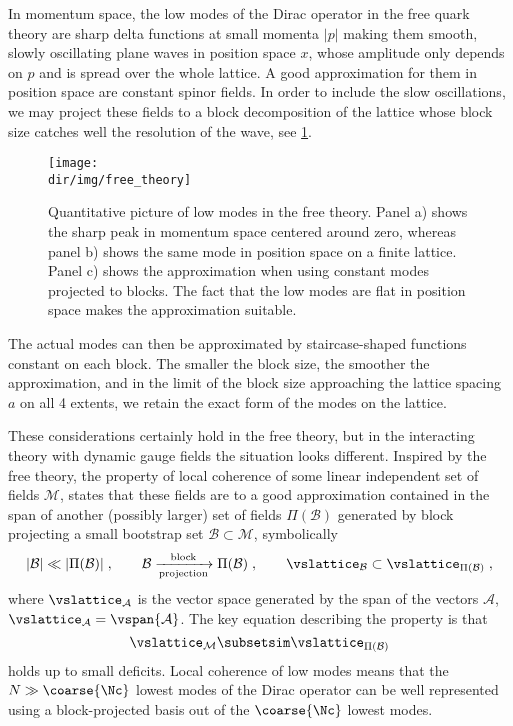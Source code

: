 In momentum space, the low modes of the Dirac operator in the free quark theory are sharp delta functions at small momenta $\lvert p \rvert$ making them smooth, slowly oscillating plane waves in position space $x$, whose amplitude only depends on $p$ and is spread over the whole lattice.
A good approximation for them in position space are constant spinor fields.
In order to include the slow oscillations, we may project these fields to a block decomposition of the lattice whose block size catches well the resolution of the wave, see \cref{fig:free:theory}.
\begin{figure}
    \centering
    \texttt{[image: \\dir/img/free\_theory]}
    \caption{Quantitative picture of low modes in the free theory. Panel a) shows the sharp peak in momentum space centered around zero, whereas panel b) shows the same mode in position space on a finite lattice. Panel c) shows the approximation when using constant modes projected to blocks. The fact that the low modes are flat in position space makes the approximation suitable.}
    \label{fig:free:theory}
\end{figure}
The actual modes can then be approximated by staircase-shaped functions constant on each block.
The smaller the block size, the smoother the approximation, and in the limit of the block size approaching the lattice spacing $a$ on all \num{4} extents, we retain the exact form of the modes on the lattice.

These considerations certainly hold in the free theory, but in the interacting theory with dynamic gauge fields the situation looks different.
Inspired by the free theory, the property of local coherence of some linear independent set of fields $\mathcal{M}$, states that these fields are to a good approximation contained in the span of another (possibly larger) set of fields $\Pi(\mathcal{B})$ generated by block projecting a small bootstrap set $\mathcal{B} \subset \mathcal{M}$, symbolically
\begin{equation} \label{eq:local:coherence:sets}
\lvert \mathcal{B} \rvert \ll \lvert \Pi(\mathcal{B}) \rvert \;,
\qquad
\mathcal{B} \xrightarrow[\text{projection}]{\text{block}} \Pi(\mathcal{B}) \;,
\qquad
\vslattice_{\mathcal{B}} \subset \vslattice_{\Pi(\mathcal{B})} \;,
\end{equation}
where $\vslattice_{\mathcal{A}}$ is the vector space generated by the span of the vectors $\mathcal{A}$, $\vslattice_{\mathcal{A}} = \vspan{\mathcal{A}}$.
The key equation describing the property is that
\begin{equation} \label{eq:local:coherence:set:approx}
\vslattice_{\mathcal{M}} \subsetsim \vslattice_{\Pi(\mathcal{B})}
\end{equation}
holds up to small deficits.
Local coherence of low modes means that the $N \gg \coarse{\Nc}$ lowest modes of the Dirac operator can be well represented using a block-projected basis out of the $\coarse{\Nc}$ lowest modes.

